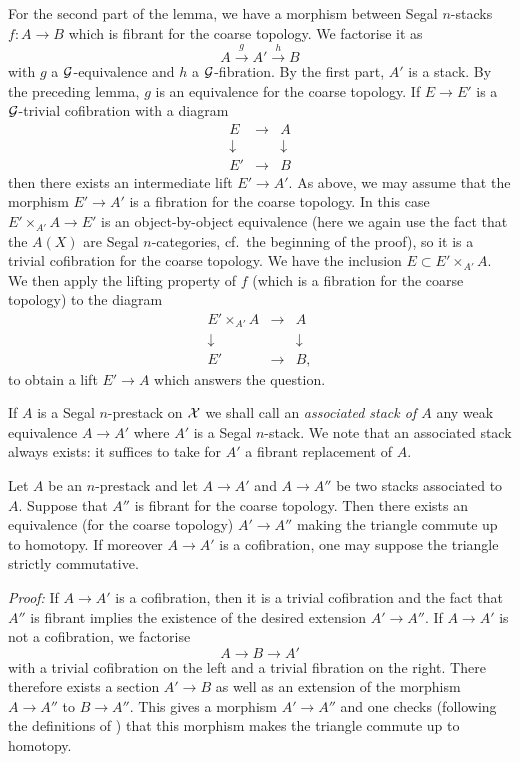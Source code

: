 For the second part of the lemma,
we have a morphism between Segal $n$-stacks $f: A\rightarrow B$ which is
fibrant for the coarse topology. We factorise it as
$$
A\stackrel{g}{\rightarrow} A'\stackrel{h}{\rightarrow} B
$$
with $g$ a ${\cal G}$-equivalence and $h$ a ${\cal G}$-fibration. By the
first part,
$A'$ is a stack. By the preceding lemma, $g$ is an equivalence for the
coarse topology. If $E\rightarrow E'$ is a ${\cal G}$-trivial cofibration
with a diagram
$$
\begin{array}{ccc}
E&\rightarrow & A\\
\downarrow && \downarrow \\
E'&\rightarrow & B
\end{array}
$$
then there exists an intermediate lift $E'\rightarrow A'$. As
above, we may assume that the morphism $E'\rightarrow A'$ is a
fibration
for the coarse topology. In this case $E'\times _{A'} A\rightarrow E'$
is an object-by-object equivalence (here we again use the fact that the
$A(X)$ are Segal $n$-categories, cf.\ the beginning of the
proof),
so it is a trivial cofibration for the coarse topology.
We have the inclusion
$E\subset E'\times _{A'}A$. We then apply the lifting
property of $f$ (which is a
fibration for the coarse topology) to the diagram
$$
\begin{array}{ccc}
E'\times _{A'}A&\rightarrow & A\\
\downarrow && \downarrow \\
E'&\rightarrow & B,
\end{array}
$$
to obtain a lift $E'\rightarrow A$ which answers the question.
\eop



If $A$ is a Segal $n$-prestack on ${\cal X}$ we shall call an {\em associated
stack of $A$} any weak
equivalence
$A\rightarrow A'$ where $A'$ is a Segal $n$-stack. We note that an associated
stack always exists: it suffices to take for $A'$ a fibrant replacement of
$A$.

\begin{corollary}
\label{unique}
Let $A$ be an $n$-prestack and let $A\rightarrow A'$ and $A\rightarrow A''$
be two stacks associated to $A$. Suppose that $A''$ is fibrant for the
coarse topology. Then there exists an equivalence (for the coarse topology)
$A'\rightarrow A''$ making the triangle commute up to homotopy.
If moreover $A\rightarrow A'$ is a cofibration, one may suppose
the triangle
strictly commutative.
\end{corollary}
{\em Proof:}
If $A\rightarrow A'$ is a cofibration, then it is a trivial cofibration and
the fact that $A''$ is fibrant implies the existence of the desired
extension $A'\rightarrow
A''$.  If $A\rightarrow A'$ is not a cofibration, we factorise
$$
A\rightarrow B \rightarrow A'
$$
with a trivial cofibration on the left and a trivial fibration
on the right. There therefore exists a section $A'\rightarrow B$ as well as an extension
of the morphism $A\rightarrow A''$ to $B\rightarrow A''$. This gives a morphism
$A'\rightarrow A''$ and one checks (following the definitions of
\cite{Quillen})
that this morphism makes the triangle commute up to homotopy.
\eop

